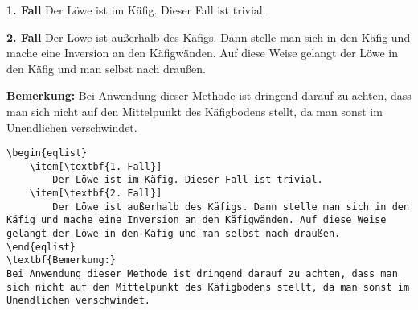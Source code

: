 \begin{frame}[fragile]
	\vspace{-0.2cm}
	\Losung
	\begin{outputbox}
		\vspace{-0.2cm}
		\begin{eqlist}
			\item[\textbf{1. Fall}]
				Der Löwe ist im Käfig. Dieser Fall ist trivial.
			\item[\textbf{2. Fall}]
				Der Löwe ist außerhalb des Käfigs. Dann stelle man sich in den Käfig und mache eine Inversion an den Käfigwänden. Auf diese Weise gelangt der Löwe in den Käfig und man selbst nach draußen.
		\end{eqlist}
		\vspace{-0.2cm}
		\textbf{Bemerkung:}
		Bei Anwendung dieser Methode ist dringend darauf zu achten, dass man sich nicht auf den Mittelpunkt des Käfigbodens stellt, da man sonst im Unendlichen verschwindet.
	\end{outputbox}
	
	\Code
	\vspace{-0.1cm}
	\begin{lstlisting}
\begin{eqlist}
	\item[\textbf{1. Fall}]
		Der Löwe ist im Käfig. Dieser Fall ist trivial.
	\item[\textbf{2. Fall}]
		Der Löwe ist außerhalb des Käfigs. Dann stelle man sich in den Käfig und mache eine Inversion an den Käfigwänden. Auf diese Weise gelangt der Löwe in den Käfig und man selbst nach draußen.
\end{eqlist}
\textbf{Bemerkung:}
Bei Anwendung dieser Methode ist dringend darauf zu achten, dass man sich nicht auf den Mittelpunkt des Käfigbodens stellt, da man sonst im Unendlichen verschwindet.
	\end{lstlisting}
\end{frame}

